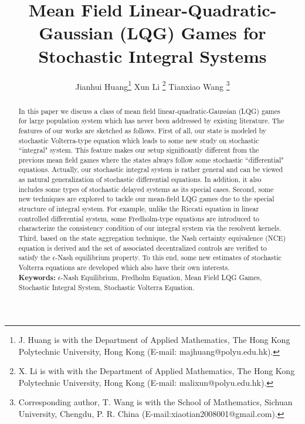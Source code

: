 \documentclass[11pt]{article}
\title{Mean Field Linear-Quadratic-Gaussian (LQG) Games for Stochastic Integral Systems}
\date{}
\begin{document}
\author{Jianhui Huang\thanks{J. Huang is with the Department of Applied Mathematics,
The Hong Kong Polytechnic University, Hong Kong (E-mail:
majhuang@polyu.edu.hk).} \quad \quad Xun Li \thanks{X. Li is with
with the Department of Applied Mathematics, The Hong Kong
Polytechnic University, Hong Kong (E-mail: malixun@polyu.edu.hk).}
\quad \quad Tianxiao Wang \thanks{Corresponding author, T. Wang is
with the School of Mathematics, Sichuan University, Chengdu, P. R.
China (E-mail:xiaotian2008001@gmail.com).}}


\maketitle


\begin{abstract}
In this paper we discuss a class of mean field
linear-quadratic-Gaussian (LQG) games for large population system
which has never been addressed by existing literature. The features
of our works are sketched as follows. First of all, our state is
modeled by stochastic Volterra-type equation which leads to some new
study on stochastic ``integral" system. This feature makes our
setup significantly different from the previous mean field games where the states
always follow some stochastic ``differential" equations.
Actually, our stochastic integral system is rather general and can
be viewed as natural generalization of stochastic differential
equations. In addition, it also includes some types of stochastic
delayed systems as its special cases. Second, some new techniques
are explored to tackle our mean-field LQG games due to the special
structure of integral system. For example, unlike the Riccati
equation in linear controlled differential system, some
Fredholm-type equations are introduced to characterize the
consistency condition of our integral system via the resolvent
kernels. Third, based on the state aggregation technique, the Nash
certainty equivalence (NCE)
equation is derived and the set of associated decentralized controls are verified to satisfy the $\epsilon$-Nash equilibrium property. To this end, some new estimates of stochastic Volterra equations are developed which also have their own interests.\\


\textbf{Keywords:}  \rm $\epsilon$-Nash Equilibrium, Fredholm Equation, Mean Field LQG Games, Stochastic Integral
System, Stochastic Volterra Equation.
\end{abstract}
\end{document}
